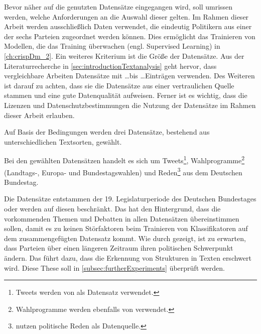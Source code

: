 Bevor näher auf die genutzten Datensätze eingegangen wird, soll umrissen werden, welche Anforderungen an die Auswahl dieser gelten. Im Rahmen dieser Arbeit werden ausschließlich Daten verwendet, die eindeutig Politikern aus einer der sechs Parteien zugeordnet werden können. Dies ermöglicht das Trainieren von Modellen, die das Training überwachen (engl. Supervised Learning) in \autoref{ch:crispDm_2}. Ein weiteres Kriterium ist die Größe der Datensätze. Aus der Literaturrecherche in \autoref{sec:introductionTextanalysis} geht hervor, dass vergleichbare Arbeiten Datensätze mit \dots bis \dots Einträgen verwenden. Des Weiteren ist darauf zu achten, dass sie die Datensätze aus einer vertraulichen Quelle stammen und eine gute Datenqualität aufweisen. Ferner ist es wichtig, dass die Lizenzen und Datenschutzbestimmungen die Nutzung der Datensätze im Rahmen dieser Arbeit erlauben.

Auf Basis der Bedingungen werden drei Datensätze, bestehend aus unterschiedlichen Textsorten, gewählt. 

Bei den  gewählten Datensätzen handelt es sich um Tweets\footnote{Tweets werden von \textcite{saltzer_bundestagswahl_2022, saltzer_finding_2022, guhr_training_2020, wong_quantifying_2016} als Datensatz verwendet.}, Wahlprogramme\footnote{Wahlprogramme werden ebenfalls von \textcite{biessmann_predicting_2016} verwendet.} (Landtags-, Europa- und Bundestagswahlen) und Reden\footnote{\textcite{doan_using_2022, biessmann_predicting_2016, simoes_fine-tuned_2020} nutzen politische Reden als Datenquelle.} aus dem Deutschen Bundestag.

Die Datensätze entstammen der 19. Legislaturperiode des Deutschen Bundestages oder werden auf diesen beschränkt. Das hat den Hintergrund, dass die vorkommenden Themen und Debatten in allen Datensätzen übereinstimmen sollen, damit es zu keinen Störfaktoren beim Trainieren von Klassifikatoren auf dem zusammengefügten Datensatz kommt. Wie durch \textcite{richter_open_2021} gezeigt, ist zu erwarten, dass Parteien über einen längeren Zeitraum ihren politischen Schwerpunkt ändern. Das führt dazu, dass die Erkennung von Strukturen in Texten erschwert wird. Diese These soll in \autoref{subsec:furtherExperiments} überprüft werden.

